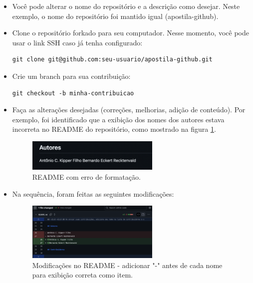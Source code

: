 \begin{itemize}
        \item Você pode alterar o nome do repositório e a descrição como desejar. Neste exemplo, o nome do repositório foi mantido igual (apostila-github).
        \item Clone o repositório forkado para seu computador. Nesse momento, você pode usar o link SSH caso já tenha configurado:
        \begin{lstlisting}[style=shellstyle]
git clone git@github.com:seu-usuario/apostila-github.git
        \end{lstlisting}
        \item Crie um branch para sua contribuição:
        \begin{lstlisting}[style=shellstyle]
git checkout -b minha-contribuicao
        \end{lstlisting}
        \item Faça as alterações desejadas (correções, melhorias, adição de conteúdo). Por exemplo, foi identificado que a exibição dos nomes dos autores estava incorreta no README do repositório, como mostrado na figura \ref{fig:README_antes_modif}.

        \begin{figure}[H]
        \centering
        \includegraphics[width=0.6\textwidth]{imgs/tutorial_contribuicao/README_antes_modif.png}
        \caption{README com erro de formatação.}
        \label{fig:README_antes_modif}
    \end{figure}

        \item Na sequência, foram feitas as seguintes modificações:

        \begin{figure}[H]
        \centering
        \includegraphics[width=0.6\textwidth]{imgs/tutorial_contribuicao/README_modif.png}
        \caption{Modificações no README - adicionar "-" antes de cada nome para exibição correta como item.}
        \label{fig:README_modif}
    \end{figure}


\end{itemize}

